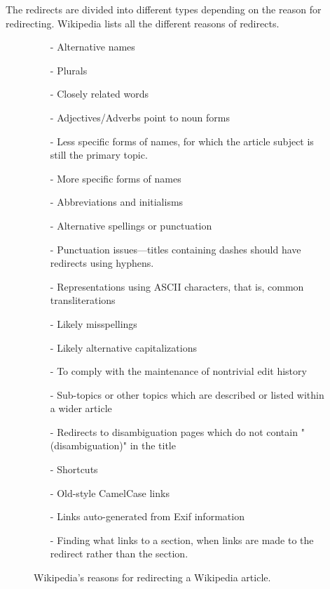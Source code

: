 The redirects are divided into different types depending on the reason for redirecting. Wikipedia lists all the different reasons of redirects. 
\begin{figure}[h]
\begin{itemize}[noitemsep]
\item[-] Alternative names 
\item[-] Plurals 
\item[-] Closely related words 
\item[-] Adjectives/Adverbs point to noun forms 
\item[-] Less specific forms of names, for which the article subject is still the primary topic. 
\item[-] More specific forms of names 
\item[-] Abbreviations and initialisms 
\item[-] Alternative spellings or punctuation
\item[-] Punctuation issues—titles containing dashes should have redirects using hyphens.
\item[-] Representations using ASCII characters, that is, common transliterations 
\item[-] Likely misspellings
\item[-] Likely alternative capitalizations 
\item[-] To comply with the maintenance of nontrivial edit history
\item[-] Sub-topics or other topics which are described or listed within a wider article
\item[-] Redirects to disambiguation pages which do not contain "(disambiguation)" in the title
\item[-] Shortcuts
\item[-] Old-style CamelCase links 
\item[-] Links auto-generated from Exif information 
\item[-] Finding what links to a section, when links are made to the redirect rather than the section.
\end{itemize}
\caption{Wikipedia's reasons for redirecting a Wikipedia article.}
\label{fig:redirectreasons}
\end{figure}


